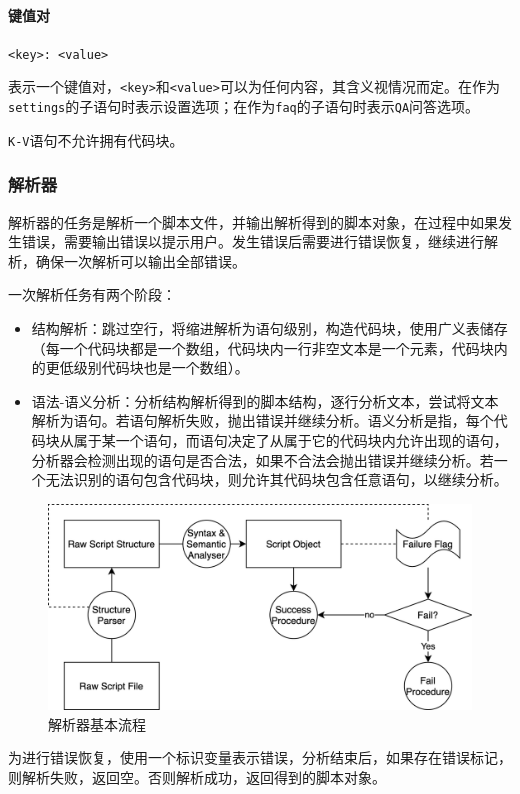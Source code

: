 \documentclass[hyperref]{ctexart}
\begin{document}
\paragraph{键值对}
\texttt{<key>: <value>}
\par 表示一个键值对，\texttt{<key>}和\texttt{<value>}可以为任何内容，其含义视情况而定。在作为\texttt{settings}的子语句时表示设置选项；在作为\texttt{faq}的子语句时表示\texttt{QA}问答选项。
\par \texttt{K-V}语句不允许拥有代码块。
\subsubsection{解析器}
解析器的任务是解析一个脚本文件，并输出解析得到的脚本对象，在过程中如果发生错误，需要输出错误以提示用户。发生错误后需要进行错误恢复，继续进行解析，确保一次解析可以输出全部错误。
\par 一次解析任务有两个阶段：
\begin{itemize}
    \item 结构解析：跳过空行，将缩进解析为语句级别，构造代码块，使用广义表储存（每一个代码块都是一个数组，代码块内一行非空文本是一个元素，代码块内的更低级别代码块也是一个数组）。
    \item 语法-语义分析：分析结构解析得到的脚本结构，逐行分析文本，尝试将文本解析为语句。若语句解析失败，抛出错误并继续分析。语义分析是指，每个代码块从属于某一个语句，而语句决定了从属于它的代码块内允许出现的语句，分析器会检测出现的语句是否合法，如果不合法会抛出错误并继续分析。若一个无法识别的语句包含代码块，则允许其代码块包含任意语句，以继续分析。
\end{itemize}
\begin{figure}[H]
    \centering
    \includegraphics[scale=0.18]{figure/8.png}
    \caption{解析器基本流程}
    \label{Fig.1.8}
\end{figure}
\par 为进行错误恢复，使用一个标识变量表示错误，分析结束后，如果存在错误标记，则解析失败，返回空。否则解析成功，返回得到的脚本对象。
\end{document}
